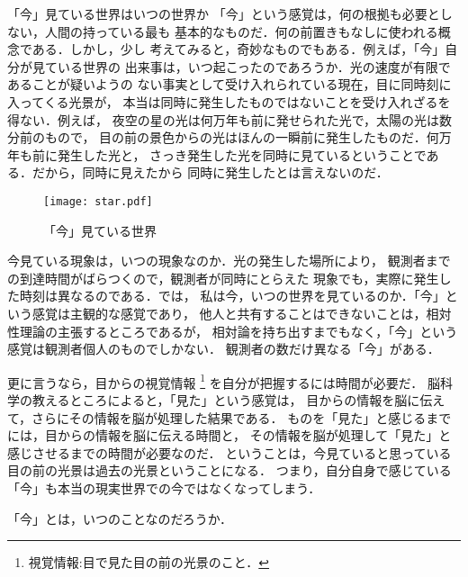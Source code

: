             \begin{memo}{「今」見ている世界はいつの世界か}
                「今」という感覚は，何の根拠も必要としない，人間の持っている最も
                基本的なものだ．何の前置きもなしに使われる概念である．しかし，少し
                考えてみると，奇妙なものでもある．例えば，「今」自分が見ている世界の
                出来事は，いつ起こったのであろうか．光の速度が有限であることが疑いようの
                ない事実として受け入れられている現在，目に同時刻に入ってくる光景が，
                本当は同時に発生したものではないことを受け入れざるを得ない．例えば，
                夜空の星の光は何万年も前に発せられた光で，太陽の光は数分前のもので，
                目の前の景色からの光はほんの一瞬前に発生したものだ．何万年も前に発生した光と，
                さっき発生した光を同時に見ているということである．だから，同時に見えたから
                同時に発生したとは言えないのだ．
                    \begin{figure}[hbt]
                        \begin{center}
                            \texttt{[image: star.pdf]}
                            \caption{「今」見ている世界}
                            \label{fig:star}
                        \end{center}
                    \end{figure}

                今見ている現象は，いつの現象なのか．光の発生した場所により，
                観測者までの到達時間がばらつくので，観測者が同時にとらえた
                現象でも，実際に発生した時刻は異なるのである．では，
                私は今，いつの世界を見ているのか．「今」という感覚は主観的な感覚であり，
                他人と共有することはできないことは，相対性理論の主張するところであるが，
                相対論を持ち出すまでもなく，「今」という感覚は観測者個人のものでしかない．
                観測者の数だけ異なる「今」がある．

                更に言うなら，目からの視覚情報
                                        \footnote{
                                                視覚情報:目で見た目の前の光景のこと．
                                        }
                を自分が把握するには時間が必要だ．
                脳科学の教えるところによると，「見た」という感覚は，
                目からの情報を脳に伝えて，さらにその情報を脳が処理した結果である．
                ものを「見た」と感じるまでには，目からの情報を脳に伝える時間と，
                その情報を脳が処理して「見た」と感じさせるまでの時間が必要なのだ．
                ということは，今見ていると思っている目の前の光景は過去の光景ということになる．
                つまり，自分自身で感じている「今」も本当の現実世界での今ではなくなってしまう．

                「今」とは，いつのことなのだろうか．

            \end{memo}


